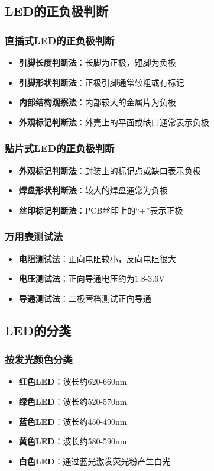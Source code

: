 \subsection{LED的正负极判断}

\subsubsection{直插式LED的正负极判断}
\begin{itemize}
    \item \textbf{引脚长度判断法}：长脚为正极，短脚为负极
    \item \textbf{引脚形状判断法}：正极引脚通常较粗或有标记
    \item \textbf{内部结构观察法}：内部较大的金属片为负极
    \item \textbf{外观标记判断法}：外壳上的平面或缺口通常表示负极
\end{itemize}

\subsubsection{贴片式LED的正负极判断}
\begin{itemize}
    \item \textbf{外观标记判断法}：封装上的标记点或缺口表示负极
    \item \textbf{焊盘形状判断法}：较大的焊盘通常为负极
    \item \textbf{丝印标记判断法}：PCB丝印上的“+”表示正极
\end{itemize}

\subsubsection{万用表测试法}
\begin{itemize}
    \item \textbf{电阻测试法}：正向电阻较小，反向电阻很大
    \item \textbf{电压测试法}：正向导通电压约为1.8-3.6V
    \item \textbf{导通测试法}：二极管档测试正向导通
\end{itemize}

\subsection{LED的分类}

\subsubsection{按发光颜色分类}
\begin{itemize}
    \item \textbf{红色LED}：波长约620-660nm
    \item \textbf{绿色LED}：波长约520-570nm
    \item \textbf{蓝色LED}：波长约450-490nm
    \item \textbf{黄色LED}：波长约580-590nm
    \item \textbf{白色LED}：通过蓝光激发荧光粉产生白光
\end{itemize}

